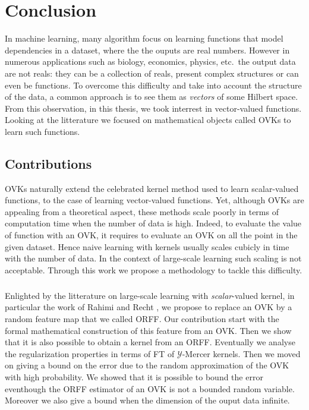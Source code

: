 \chapter{Conclusion}
\bigskip
\begin{justify}
    In machine learning, many algorithm focus on learning functions that model
    dependencies in a dataset, where the the ouputs are real numbers. However
    in numerous applications such as biology, economics, physics, etc.~the
    output data are not reals: they can be a collection of reals, present
    complex structures or can even be functions. To overcome this difficulty
    and take into account the structure of the data, a common approach is to
    see them as \emph{vectors} of some Hilbert space. From this observation, in
    this thesis, we took interrest in vector-valued functions. Looking at the
    litterature we focused on mathematical objects called \aclp{OVK} to learn
    such functions.
    \section{Contributions}
    \acsp{OVK} naturally extend the celebrated kernel method used to learn
    scalar-valued functions, to the case of learning vector-valued functions.
    Yet, although \acsp{OVK} are appealing from a theoretical aspect, these
    methods scale poorly in terms of computation time when the number of data
    is high. Indeed, to evaluate the value of function with an \acl{OVK}, it
    requires to evaluate an \acl{OVK} on all the point in the given dataset.
    Hence naive learning with kernels usually scales cubicly in time with the
    number of data. In the context of large-scale learning such scaling is not
    acceptable. Through this work we propose a methodology to tackle this
    difficulty.
    \paragraph{}
    Enlighted by the litterature on large-scale learning with
    \emph{scalar}-valued kernel, in particular the work of Rahimi and Recht
    \citep{Rahimi2007}, we propose to replace an \acs{OVK} by a random feature
    map that we called \acl{ORFF}. Our contribution start with the formal
    mathematical construction of this feature from an \acs{OVK}. Then we show
    that it is also possible to obtain a kernel from an \acs{ORFF}. Eventually
    we analyse the regularization properties in terms of \acl{FT} of
    $\mathcal{Y}$-Mercer kernels. Then we moved on giving a bound on the error
    due to the random approximation of the \acs{OVK} with high probability.
    We showed that it is possible to bound the error eventhough the \acs{ORFF}
    estimator of an \acs{OVK} is not a bounded random variable. Moreover we
    also give a bound when the dimension of the ouput data infinite.

\end{justify}
